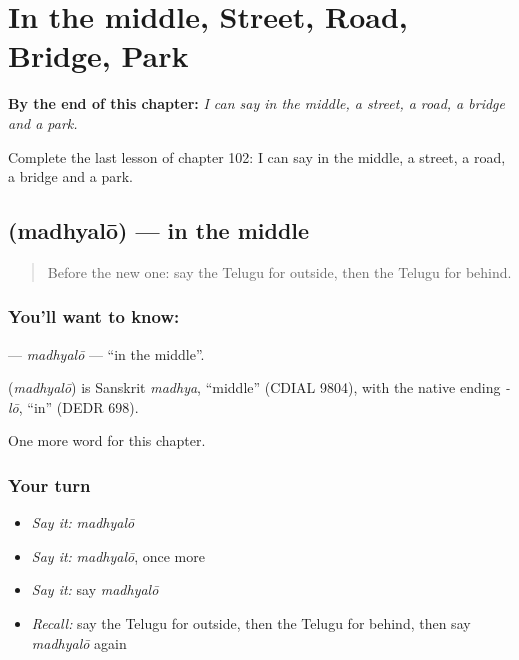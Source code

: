 
\chapter{In the middle, Street, Road, Bridge, Park}
\label{ch:te-in-the-middle-street-road-bridge-park}

\begin{chapteropening}
\textbf{By the end of this chapter:} \emph{I can say in the middle, a street, a road, a bridge and a park.}

Complete the last lesson of chapter 102: I can say in the middle, a street, a road, a bridge and a park.
\end{chapteropening}

\section[\texorpdfstring{\te{మధ్యలో} (madhyalō)}{మధ్యలో (madhyalō)}]{ (madhyalō) — in the middle}

\label{lesson:TE-C102-madhyalo}



\begin{quote}
Before the new one: say the Telugu for outside, then the Telugu for behind.
\end{quote}

\subsection*{You'll want to know: }
\textbf{} — \emph{madhyalō} — \textquotedblleft{}in the middle\textquotedblright{}.

\begin{cousinweb}
\textbf{} (\emph{madhyalō}) is Sanskrit \emph{madhya}, \textquotedblleft{}middle\textquotedblright{} (CDIAL 9804), with the native ending \emph{-lō}, \textquotedblleft{}in\textquotedblright{} (DEDR 698).
\end{cousinweb}

\begin{grammarlens}[title={What you've built}]
One more word for this chapter.
\end{grammarlens}

\subsection*{Your turn}
\begin{itemize}
\raggedright
  \item \emph{Say it:} \emph{madhyalō}
  \item \emph{Say it:} \emph{madhyalō}, once more
  \item \emph{Say it:} say \emph{madhyalō}
  \item \emph{Recall:} say the Telugu for outside, then the Telugu for behind, then say \emph{madhyalō} again
\end{itemize}

